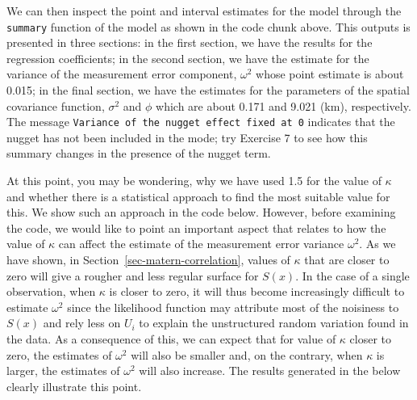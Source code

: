 \documentclass[
  letterpaper,
]{krantz}
\begin{document}
We can then inspect the point and interval estimates for the model
through the \texttt{summary} function of the model as shown in the code
chunk above. This outputs is presented in three sections: in the first
section, we have the results for the regression coefficients; in the
second section, we have the estimate for the variance of the measurement
error component, \(\omega^2\) whose point estimate is about 0.015; in
the final section, we have the estimates for the parameters of the
spatial covariance function, \(\sigma^2\) and \(\phi\) which are about
0.171 and 9.021 (km), respectively. The message
\texttt{Variance\ of\ the\ nugget\ effect\ fixed\ at\ 0} indicates that
the nugget has not been included in the mode; try Exercise 7 to see how
this summary changes in the presence of the nugget term.

At this point, you may be wondering, why we have used 1.5 for the value
of \(\kappa\) and whether there is a statistical approach to find the
most suitable value for this. We show such an approach in the code
below. However, before examining the code, we would like to point an
important aspect that relates to how the value of \(\kappa\) can affect
the estimate of the measurement error variance \(\omega^2\). As we have
shown, in Section~\ref{sec-matern-correlation}, values of \(\kappa\)
that are closer to zero will give a rougher and less regular surface for
\(S(x)\). In the case of a single observation, when \(\kappa\) is closer
to zero, it will thus become increasingly difficult to estimate
\(\omega^2\) since the likelihood function may attribute most of the
noisiness to \(S(x)\) and rely less on \(U_i\) to explain the
unstructured random variation found in the data. As a consequence of
this, we can expect that for value of \(\kappa\) closer to zero, the
estimates of \(\omega^2\) will also be smaller and, on the contrary,
when \(\kappa\) is larger, the estimates of \(\omega^2\) will also
increase. The results generated in the below clearly illustrate this
point.
\end{document}
